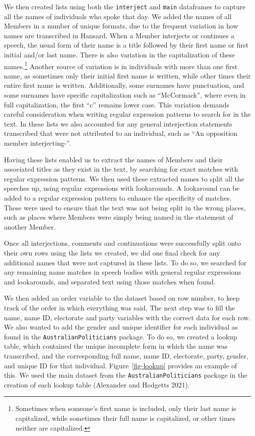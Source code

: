 \documentclass[
  letterpaper,
  DIV=11,
  numbers=noendperiod]{scrartcl}
\begin{document}
We then created lists using both the \texttt{interject} and
\texttt{main} dataframes to capture all the names of individuals who
spoke that day. We added the names of all Members in a number of unique
formats, due to the frequent variation in how names are transcribed in
Hansard. When a Member interjects or continues a speech, the usual form
of their name is a title followed by their first name or first initial
and/or last name. There is also variation in the capitalization of these
names.\footnote{Sometimes when someone's first name is included, only
  their last name is capitalized, while sometimes their full name is
  capitalized, or other times neither are capitalized.} Another source
of variation is in individuals with more than one first name, as
sometimes only their initial first name is written, while other times
their entire first name is written. Additionally, some surnames have
punctuation, and some surnames have specific capitalization such as
``McCormack'', where even in full capitalization, the first ``c''
remains lower case. This variation demands careful consideration when
writing regular expression patterns to search for in the text. In these
lists we also accounted for any general interjection statements
transcribed that were not attributed to an individual, such as ``An
opposition member interjecting-''.

Having these lists enabled us to extract the names of Members and their
associated titles as they exist in the text, by searching for exact
matches with regular expression patterns. We then used these extracted
names to split all the speeches up, using regular expressions with
lookarounds. A lookaround can be added to a regular expression pattern
to enhance the specificity of matches. These were used to ensure that
the text was not being split in the wrong places, such as places where
Members were simply being named in the statement of another Member.

Once all interjections, comments and continuations were successfully
split onto their own rows using the lists we created, we did one final
check for any additional names that were not captured in these lists. To
do so, we searched for any remaining name matches in speech bodies with
general regular expressions and lookarounds, and separated text using
those matches when found.

We then added an order variable to the dataset based on row number, to
keep track of the order in which everything was said. The next step was
to fill the name, name ID, electorate and party variables with the
correct data for each row. We also wanted to add the gender and unique
identifier for each individual as found in the
\texttt{AustralianPoliticians} package. To do so, we created a lookup
table, which contained the unique incomplete form in which the name was
transcribed, and the corresponding full name, name ID, electorate,
party, gender, and unique ID for that individual.
Figure~\ref{fig-lookup} provides an example of this. We used the main
dataset from the \texttt{AustralianPoliticians} package in the creation
of each lookup table (Alexander and Hodgetts 2021).
\end{document}
